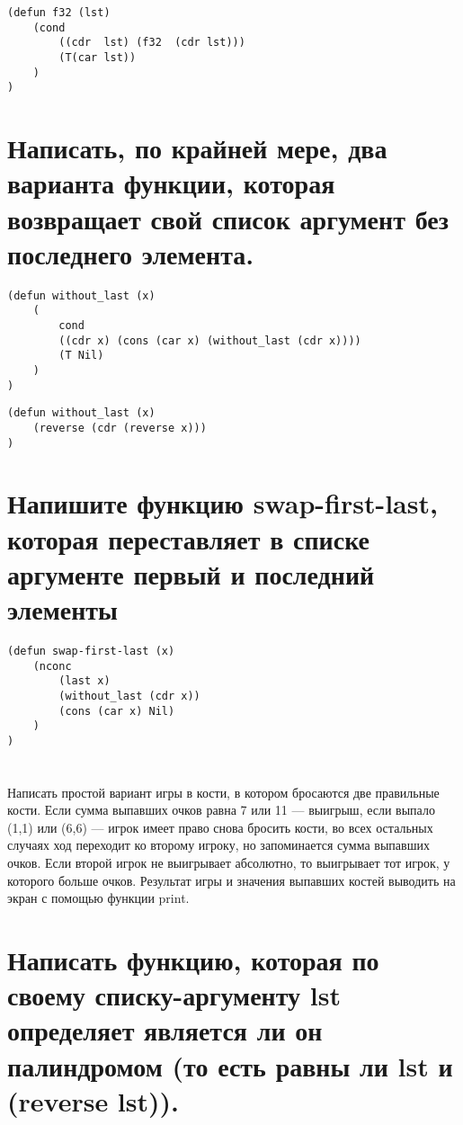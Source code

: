 \documentclass[a4paper, 14pt, unknownkeysallowed]{extreport}
\begin{document}
\begin{lstlisting}
(defun f32 (lst)
	(cond
		((cdr  lst) (f32  (cdr lst)))
		(T(car lst))
	)
)
\end{lstlisting}

\section{Написать, по крайней мере, два варианта функции, которая возвращает
	свой список аргумент без последнего элемента. }

\begin{lstlisting}
(defun without_last (x)
	(
		cond 
		((cdr x) (cons (car x) (without_last (cdr x))))
		(T Nil)
	)
)
\end{lstlisting}

\begin{lstlisting}
(defun without_last (x)
	(reverse (cdr (reverse x)))
)
\end{lstlisting}
\clearpage
\section{Напишите функцию swap-first-last, которая переставляет в списке аргументе первый и последний элементы}

\begin{lstlisting}
(defun swap-first-last (x)
	(nconc 
		(last x)
		(without_last (cdr x))
		(cons (car x) Nil)
	)
)
\end{lstlisting}


\section{}
Написать простой вариант игры в кости, в котором бросаются две
правильные кости. Если сумма выпавших очков равна 7 или 11 —
выигрыш, если выпало (1,1) или (6,6) — игрок имеет право снова
бросить кости, во всех остальных случаях ход переходит ко второму
игроку, но запоминается сумма выпавших очков. Если второй игрок не
выигрывает абсолютно, то выигрывает тот игрок, у которого больше
очков. Результат игры и значения выпавших костей выводить на экран с помощью функции print. 



\section{Написать функцию, которая по своему списку-аргументу lst определяет 
	является ли он палиндромом (то есть равны ли lst и (reverse lst)).}
\end{document}
